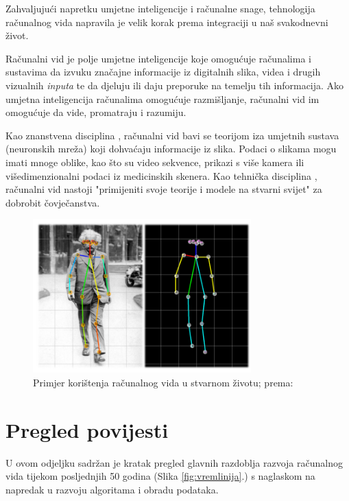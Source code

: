 \documentclass[]{foi} %
\begin{document}
Zahvaljujući napretku umjetne inteligencije i računalne snage, tehnologija računalnog vida napravila je velik korak prema integraciji u naš svakodnevni život.

Računalni vid je polje umjetne inteligencije \cite{wikipedia} koje omogućuje računalima i sustavima da izvuku značajne informacije iz digitalnih slika, videa i drugih vizualnih \textit{inputa} te da djeluju ili daju preporuke na temelju tih informacija. Ako umjetna inteligencija računalima omogućuje razmišljanje, računalni vid im omogućuje da vide, promatraju i razumiju.

Kao znanstvena disciplina \cite{wikipedia}, računalni vid bavi se teorijom iza umjetnih sustava (neuronskih mreža) koji dohvaćaju informacije iz slika. Podaci o slikama mogu imati mnoge oblike, kao što su video sekvence, prikazi s više kamera ili višedimenzionalni podaci iz medicinskih skenera.
Kao tehnička disciplina \cite{wikipedia}, računalni vid nastoji "primijeniti svoje teorije i modele na stvarni svijet" za dobrobit čovječanstva.

\vspace{10mm}
\begin{figure}[!ht]
    \centering
    \includegraphics[width=0.75\textwidth]{slike/einstein.png}
    \caption{Primjer korištenja računalnog vida u stvarnom životu; prema: \cite{szeliskicvaa}}
    \label{fig:einstein}
\end{figure}

\newpage
\section{Pregled povijesti}

U ovom odjeljku sadržan je kratak pregled glavnih razdoblja razvoja računalnog vida tijekom posljednjih 50 godina (Slika \ref{fig:vremlinija}.) s naglaskom na napredak u razvoju algoritama i obradu podataka.
\end{document}

